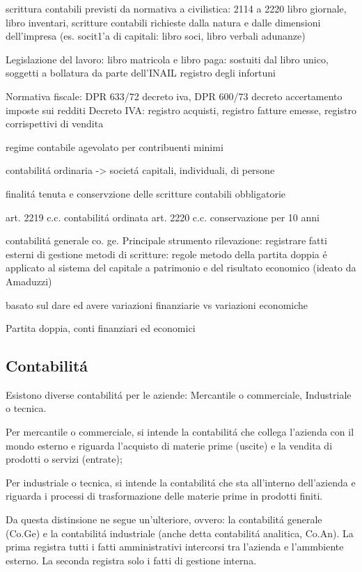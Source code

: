 \documentclass{article}
\begin{document}
scrittura contabili previsti da normativa a civilistica: 2114 a 2220
libro giornale, libro inventari, scritture contabili richieste dalla natura e dalle dimensioni dell'impresa (es. socit1'a di capitali: libro soci, libro verbali adunanze)

Legislazione del lavoro: libro matricola e libro paga: sostuiti dal libro unico, soggetti a bollatura da parte dell'INAIL
registro degli infortuni

Normativa fiscale: 
DPR 633/72 decreto iva, DPR 600/73 decreto accertamento imposte sui redditi
Decreto IVA: registro acquisti, registro fatture emesse, registro corrispettivi di vendita

regime contabile agevolato per contribuenti minimi

contabilit\'a ordinaria -> societ\'a capitali, individuali, di persone

finalit\'a tenuta e conservzione delle scritture contabili obbligatorie

art. 2219 c.c. contabilit\'a ordinata
art. 2220 c.c. conservazione per 10 anni

contabilit\'a generale
co. ge.
Principale strumento rilevazione: registrare fatti esterni di gestione
metodi di scritture: regole
metodo della partita doppia \'e applicato al sistema del capitale a patrimonio e del risultato economico
(ideato da Amaduzzi)

basato sul dare ed avere
variazioni finanziarie vs variazioni economiche

Partita doppia, conti finanziari ed economici

\subsection{Contabilit\'a}

Esistono diverse contabilit\'a per le aziende: Mercantile o commerciale, Industriale o tecnica.

Per mercantile o commerciale, si intende la contabilit\'a che collega l'azienda con il mondo esterno e riguarda l'acquisto di materie prime (uscite) e la vendita di prodotti o servizi (entrate);

Per industriale o tecnica, si intende la contabilit\'a che sta all'interno dell'azienda e riguarda i processi di trasformazione delle materie prime in prodotti finiti.

Da questa distinsione ne segue un'ulteriore, ovvero: la contabilit\'a generale (Co.Ge) e la contabilit\'a industriale (anche detta contabilit\'a analitica, Co.An).
La prima registra tutti i fatti amministrativi intercorsi tra l'azienda e l'ammbiente esterno. La seconda registra solo i fatti di gestione interna.
\end{document}

